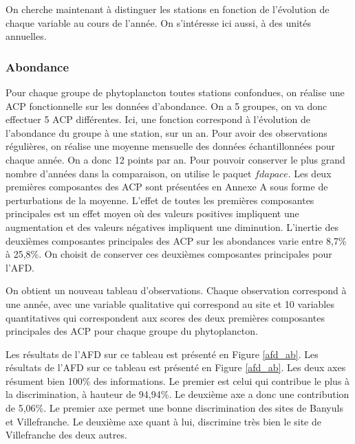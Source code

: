 \documentclass[12pt]{article}
\begin{document}
On cherche maintenant à distinguer les stations en fonction de l’évolution de chaque variable au cours de l’année. On s’intéresse ici aussi, à des unités annuelles. 

\subsubsection{Abondance}

Pour chaque groupe de phytoplancton toutes stations confondues, on réalise une ACP fonctionnelle sur les données d’abondance. On a 5 groupes, on va donc effectuer 5 ACP différentes. Ici, une fonction correspond à l’évolution de l’abondance du groupe à une station, sur un an. Pour avoir des observations régulières, on réalise une moyenne mensuelle des données échantillonnées pour chaque année. On a donc 12 points par an. Pour pouvoir conserver le plus grand nombre d’années dans la comparaison, on utilise le paquet $fdapace$. Les deux premières composantes des ACP sont présentées en Annexe A sous forme de perturbations de la moyenne. L’effet de toutes les premières composantes principales est un effet moyen où des valeurs positives impliquent une augmentation et des valeurs négatives impliquent une diminution. L’inertie des deuxièmes composantes principales des ACP sur les abondances varie entre 8,7\% à 25,8\%. On choisit de conserver ces deuxièmes composantes principales pour l’AFD.

On obtient un nouveau tableau d’observations. Chaque observation correspond à une année, avec une variable qualitative qui correspond au site et 10 variables quantitatives qui correspondent aux scores des deux premières composantes principales des ACP pour chaque groupe du phytoplancton. 

Les résultats de l’AFD sur ce tableau est présenté en Figure \ref{afd_ab}. Les résultats de l’AFD sur ce tableau est présenté en Figure \ref{afd_ab}. Les deux axes résument bien 100\% des informations. Le premier est celui qui contribue le plus à la discrimination, à hauteur de 94,94\%. Le deuxième axe a donc une contribution de 5,06\%. Le premier axe permet une bonne discrimination des sites de Banyuls et Villefranche. Le deuxième axe quant à lui, discrimine très bien le site de Villefranche des deux autres. 
\end{document}
